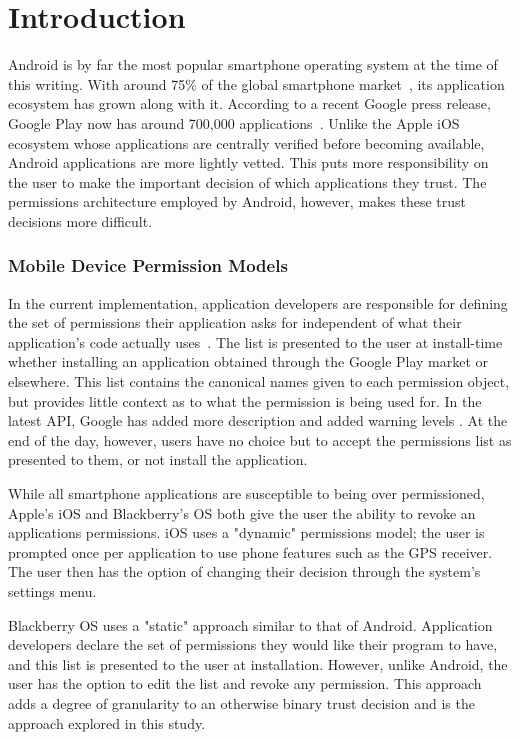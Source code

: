 \chapter{Introduction}
Android is by far the most popular smartphone operating system at the time of this writing. With around 75\% of the global smartphone market~\cite{Perez}, its application ecosystem has grown along with it.  According to a recent Google press release, Google Play now has around 700,000 applications~\cite{Womack}. Unlike the Apple iOS ecosystem whose applications are centrally verified before becoming available, Android applications are more lightly vetted. This puts more responsibility on the user to make the important decision of which applications they trust. The permissions architecture employed by Android, however, makes these trust decisions more difficult. 

\subsection{Mobile Device Permission Models}
In the current implementation, application developers are responsible for defining the set of permissions their application asks for independent of what their application’s code actually uses~\cite{Felt}. The list is presented to the user at install-time whether installing an 
application obtained through the Google Play market or elsewhere. This list contains the canonical names given to each permission object, but provides little context as to what the permission is being used for. In the latest API, Google has added more description and added warning levels . At the end of the day, however, users have no choice but to accept the permissions list as presented to them, or not install the application.

While all smartphone applications are susceptible to being over permissioned, Apple's iOS and Blackberry's OS both give the user the ability to revoke an applications permissions. iOS uses a "dynamic" permissions model; the user is prompted once per application to use phone features such as the GPS receiver. The user then has the option of changing their decision through the system's settings menu. 

Blackberry OS uses a "static" approach similar to that of Android. Application developers declare the set of permissions they would like their program to have, and this list is presented to the user at installation. However, unlike Android, the user has the option to edit the list and revoke any permission. This approach adds a degree of granularity to an otherwise binary trust decision and is the approach explored in this study.

